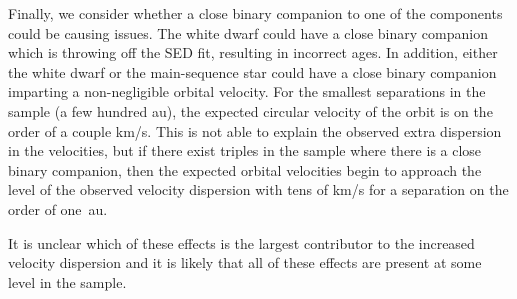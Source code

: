 
Finally, we consider whether a close binary companion to one of the components could be causing issues. The white dwarf could have a close binary companion which is throwing off the SED fit, resulting in incorrect ages. In addition, either the white dwarf or the main-sequence star could have a close binary companion imparting a non-negligible orbital velocity. For the smallest separations in the sample (a few hundred au), the expected circular velocity of the orbit is on the order of a couple km/s. This is not able to explain the observed extra dispersion in the velocities, but if there exist triples in the sample where there is a close binary companion, then the expected orbital velocities begin to approach the level of the observed velocity dispersion with tens of km/s for a separation on the order of one~au.  

It is unclear which of these effects is the largest contributor to the increased velocity dispersion and it is likely that all of these effects are present at some level in the sample.
